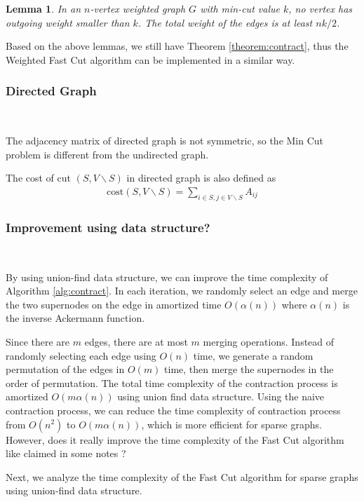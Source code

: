 \documentclass[12pt]{article}
\theoremstyle{plain}
\newtheorem{lemma}{Lemma}[section]
\begin{document}
\begin{lemma}
    In an $n$-vertex weighted graph $G$ with min-cut value $k$, no vertex has outgoing weight smaller than $k$. The total weight of the edges is at least $nk/2$.
\end{lemma}

Based on the above lemmas, we still have Theorem \ref{theorem:contract}, thus the Weighted Fast Cut algorithm can be implemented in a similar way.

\subsubsection{Directed Graph}\

The adjacency matrix of directed graph is not symmetric, so the Min Cut problem is different from the undirected graph.

The cost of cut $(S,V\backslash S)$ in directed graph is also defined as
\begin{align*}
    \text{cost}(S,V\backslash S)=\sum_{i\in S, j\in V\backslash S}A_{ij}
\end{align*}

\subsubsection{Improvement using data structure?}\

By using union-find data structure, we can improve the time complexity of Algorithm \ref{alg:contract}. In each iteration, we randomly select an edge and merge the two supernodes on the edge in amortized time $O(\alpha(n))$ where $\alpha(n)$ is the inverse Ackermann function. 

Since there are $m$ edges,  there are at most $m$ merging operations. Instead of randomly selecting each edge using $O(n)$ time, we generate a random permutation of the edges in $O(m)$ time, then merge the supernodes in the order of permutation. The total time complexity of the contraction process is amortized $O(m\alpha(n))$ using union find data structure. Using the naive contraction process, we can reduce the time complexity of contraction process from $O(n^2)$ to $O(m\alpha(n))$, which is more efficient for sparse graphs. However, does it really improve the time complexity of the Fast Cut algorithm like claimed in some notes\cite{CS161Lecture16} ?

Next, we analyze the time complexity of the Fast Cut algorithm for sparse graphs using union-find data structure.
\end{document}
